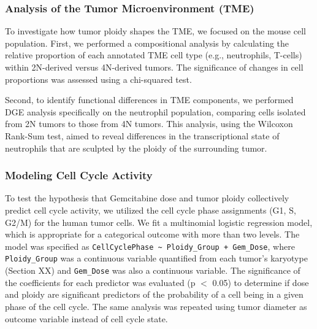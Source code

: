 \documentclass{article}
\begin{document}
\subsubsection{Analysis of the Tumor Microenvironment (TME)}
To investigate how tumor ploidy shapes the TME, we focused on the mouse cell population. First, we performed a compositional analysis by calculating the relative proportion of each annotated TME cell type (e.g., neutrophils, T-cells) within 2N-derived versus 4N-derived tumors. The significance of changes in cell proportions was assessed using a chi-squared test. 

Second, to identify functional differences in TME components, we performed DGE analysis specifically on the neutrophil population, comparing cells isolated from 2N tumors to those from 4N tumors. This analysis, using the Wilcoxon Rank-Sum test, aimed to reveal differences in the transcriptional state of neutrophils that are sculpted by the ploidy of the surrounding tumor.

\subsubsection{Modeling Cell Cycle Activity}
To test the hypothesis that Gemcitabine dose and tumor ploidy collectively predict cell cycle activity, we utilized the cell cycle phase assignments (G1, S, G2/M) for the human tumor cells. We fit a multinomial logistic regression model, which is appropriate for a categorical outcome with more than two levels. \color{blue} The model was specified as \texttt{CellCyclePhase \textasciitilde{} Ploidy\_Group + Gem\_Dose}, where \texttt{Ploidy\_Group} was a continuous variable quantified from each tumor's karyotype (Section XX) and \texttt{Gem\_Dose} was also a continuous variable. The significance of the coefficients for each predictor was evaluated (p $<$ 0.05) to determine if dose and ploidy are significant predictors of the probability of a cell being in a given phase of the cell cycle. The same analysis was repeated using tumor diameter as outcome variable instead of cell cycle state.\color{black}
\end{document}
